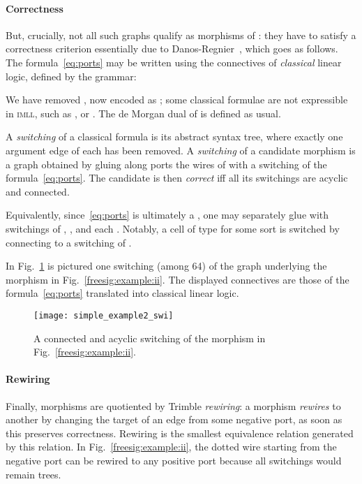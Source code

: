 \documentclass{llncs}
\newcommand{\imll}{\textsc{imll}}
\begin{document}
\paragraph{Correctness}
But, crucially, not all such graphs qualify as morphisms of : they have to satisfy a correctness criterion essentially
due to Danos-Regnier~\cite{Danos:mll}, which goes as follows.
The formula~\eqref{eq:ports} may be written using the connectives
of \emph{classical} linear logic, defined by the grammar:

We have removed , now encoded as ; some
classical formulae are not expressible in \imll{}, such as , or
. The de Morgan dual  of  is defined as usual.

A \emph{switching} of a classical formula is its abstract syntax tree,
where exactly one argument edge of each  has been removed. A
\emph{switching} of a candidate morphism  is a graph obtained by
gluing along ports the wires of  with a switching of the
formula~\eqref{eq:ports}. The candidate is then \emph{correct} iff all
its switchings are acyclic and connected.

Equivalently, since~\eqref{eq:ports} is ultimately a , one may
separately glue  with switchings of , , and each
. Notably, a cell of type  for
some sort  is switched by connecting  to a switching of .

In Fig.~\ref{freesig:super_example} is pictured one switching (among 64) of
the graph underlying the morphism in Fig.~\ref{freesig:example:ii}. 
The displayed connectives are those of the formula~\eqref{eq:ports} translated
into classical linear logic. 
\begin{figure}[ht] \centering
    \texttt{[image: simple\_example2\_swi]}
    \caption{A connected and acyclic switching of the morphism in Fig.~\ref{freesig:example:ii}.}
    \label{freesig:super_example}
\end{figure}

\paragraph{Rewiring} 
Finally, morphisms are quotiented by Trimble \emph{rewiring}: a
morphism \emph{rewires} to another by changing the target of an edge
from some negative  port, as soon as this preserves
correctness. Rewiring is the smallest equivalence relation generated
by this relation.  
In Fig.~\ref{freesig:example:ii}, the dotted wire starting from the
negative  port can be rewired to any positive port because all switchings
would remain trees. 
\end{document}
